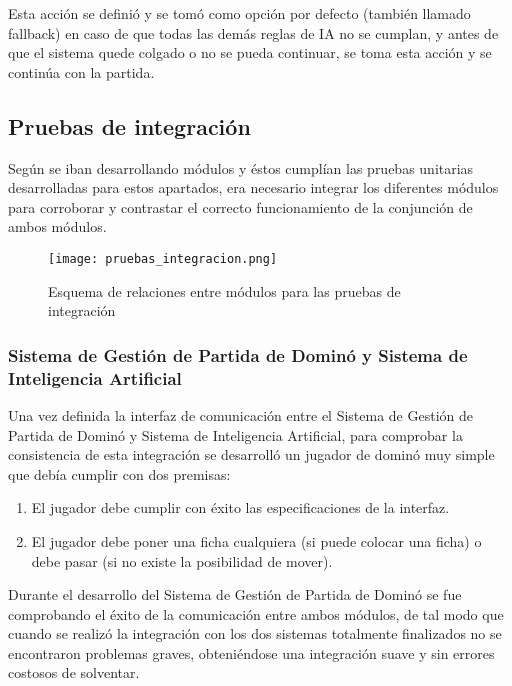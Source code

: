 Esta acción se definió y se tomó como opción por defecto (también llamado fallback) en caso de que todas las demás reglas
de IA no se cumplan, y antes de que el sistema quede colgado o no se pueda continuar, se toma esta acción y se continúa
con la partida.


\subsection{Pruebas de integración}

Según se iban desarrollando módulos y éstos cumplían las pruebas unitarias desarrolladas para estos apartados, era necesario
integrar los diferentes módulos para corroborar y contrastar el correcto funcionamiento de la conjunción de ambos módulos.

\begin{figure}[h]
  \label{pruebas_integracion}
  \begin{center}
    \texttt{[image: pruebas\_integracion.png]}
  \end{center}
  \caption{Esquema de relaciones entre módulos para las pruebas de integración}
\end{figure}

\subsubsection{Sistema de Gestión de Partida de Dominó y Sistema de Inteligencia Artificial}

Una vez definida la interfaz de comunicación entre el Sistema de Gestión de Partida de Dominó y Sistema de Inteligencia
Artificial, para comprobar la consistencia de esta integración se desarrolló un jugador de dominó muy simple que debía
cumplir con dos premisas:

\begin{enumerate}
    \item El jugador debe cumplir con éxito las especificaciones de la interfaz.
    \item El jugador debe poner una ficha cualquiera (si puede colocar una ficha) o debe pasar (si no existe la posibilidad
            de mover).
\end{enumerate}

Durante el desarrollo del Sistema de Gestión de Partida de Dominó se fue comprobando el éxito de la comunicación entre ambos
módulos, de tal modo que cuando se realizó la integración con los dos sistemas totalmente finalizados no se encontraron
problemas graves, obteniéndose una integración suave y sin errores costosos de solventar.


